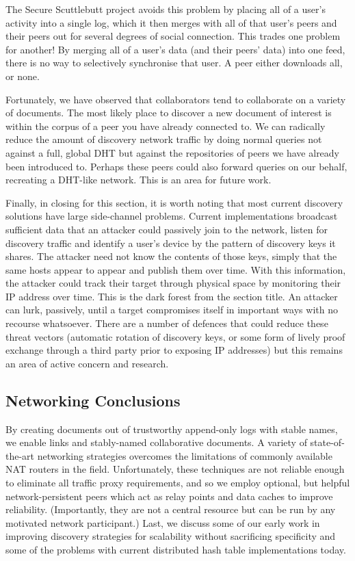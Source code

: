 \documentclass[sigplan,10pt]{acmart}
\begin{document}

The Secure Scuttlebutt\cite{SecureScuttlebutt} project avoids this problem by placing all of a user's activity into a single log, which it then merges with all of that user's peers and their peers out for several degrees of social connection. This trades one problem for another! By merging all of a user's data (and their peers' data) into one feed, there is no way to selectively synchronise that user. A peer either downloads all, or none. 

Fortunately, we have observed that collaborators tend to collaborate on a variety of documents. The most likely place to discover a new document of interest is within the corpus of a peer you have already connected to. We can radically reduce the amount of discovery network traffic by doing normal queries not against a full, global DHT but against the repositories of peers we have already been introduced to. Perhaps these peers could also forward queries on our behalf, recreating a DHT-like network. This is an area for future work.

Finally, in closing for this section, it is worth noting that most current discovery solutions have large side-channel problems. Current implementations broadcast sufficient data that an attacker could passively join to the network, listen for discovery traffic and identify a user's device by the pattern of discovery keys it shares. The attacker need not know the contents of those keys, simply that the same hosts appear to appear and publish them over time. With this information, the attacker could track their target through physical space by monitoring their IP address over time. This is the dark forest from the section title. An attacker can lurk, passively, until a target compromises itself in important ways with no recourse whatsoever. There are a number of defences that could reduce these threat vectors (automatic rotation of discovery keys, or some form of lively proof exchange through a third party prior to exposing IP addresses) but this remains an area of active concern and research.

\subsection{Networking Conclusions}

By creating documents out of trustworthy append-only logs with stable names, we enable links and stably-named collaborative documents. A variety of state-of-the-art networking strategies overcomes the limitations of commonly available NAT routers in the field. Unfortunately, these techniques are not reliable enough to eliminate all traffic proxy requirements, and so we employ optional, but helpful network-persistent peers which act as relay points and data caches to improve reliability. (Importantly, they are not a central resource but can be run by any motivated network participant.) Last, we discuss some of our early work in improving discovery strategies for scalability without sacrificing specificity and some of the problems with current distributed hash table implementations today.
\end{document}
